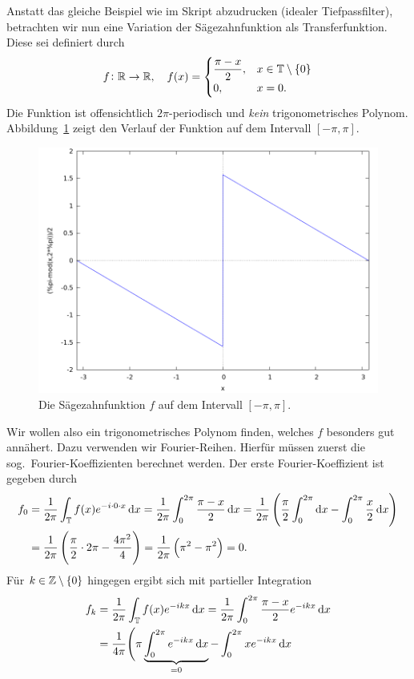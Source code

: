 \begin{example}
Anstatt das gleiche Beispiel wie im Skript abzudrucken (idealer Tiefpassfilter), betrachten wir nun
eine Variation der Sägezahnfunktion als Transferfunktion. Diese sei definiert durch
\[
  f \colon \mathbb{R} \rightarrow \mathbb{R}, \quad f(x) = \begin{cases}
    \dfrac{\pi - x}{2}, & x \in \mathbb{T} \setminus \{ 0 \} \\
    0, & x = 0.
  \end{cases}
\]
Die Funktion ist offensichtlich $ 2\pi $-periodisch und \emph{kein} trigonometrisches Polynom. 
Abbildung~\ref{fig:sawtooth} zeigt den Verlauf der Funktion auf dem Intervall $ [-\pi, \pi] $.
\begin{figure}[ht]
\centering
\includegraphics[width=0.5\linewidth]{Bilder/sawtooth}
\caption{Die Sägezahnfunktion $ f $ auf dem Intervall $ [-\pi, \pi] $.}
\label{fig:sawtooth}
\end{figure}
Wir wollen also ein trigonometrisches Polynom finden, welches $ f $ besonders gut annähert. Dazu
verwenden wir Fourier-Reihen. Hierfür müssen zuerst die sog.\ Fourier-Koeffizienten berechnet 
werden. Der erste Fourier-Koeffizient ist gegeben durch
\begin{align*}
   f_{0} 
&= \frac{1}{2\pi} \int_{\T} f(x) e^{- i \cdot 0 \cdot x} \dif x
 = \frac{1}{2\pi} \int_{0}^{2\pi} \frac{\pi - x}{2} \dif x
 = \frac{1}{2\pi} \left( 
     \frac{\pi}{2} \int_{0}^{2\pi} \dif x - \int_{0}^{2\pi} \frac{x}{2} \dif x
   \right) \\
&= \frac{1}{2\pi} \left( \frac{\pi}{2} \cdot 2\pi - \frac{4\pi^{2}}{4} \right)
 = \frac{1}{2\pi} \left( \pi^{2} - \pi^{2} \right)
 = 0.
\end{align*}
Für $ k \in \mathbb{Z} \setminus \{ 0 \} $ hingegen ergibt sich mit partieller Integration
\begin{align*}
   f_{k}
&= \frac{1}{2\pi} \int_{\T} f(x) e^{-ikx} \dif x
 = \frac{1}{2\pi} \int_{0}^{2\pi} \frac{\pi - x}{2} e^{-ikx} \dif x \\
&= \frac{1}{4\pi} \Bigg( 
      \pi \underbrace{ \int_{0}^{2\pi} e^{-ikx} \dif x }_{=0} - \int_{0}^{2\pi} xe^{-ikx} \dif x

\end{align*}
\end{example}
